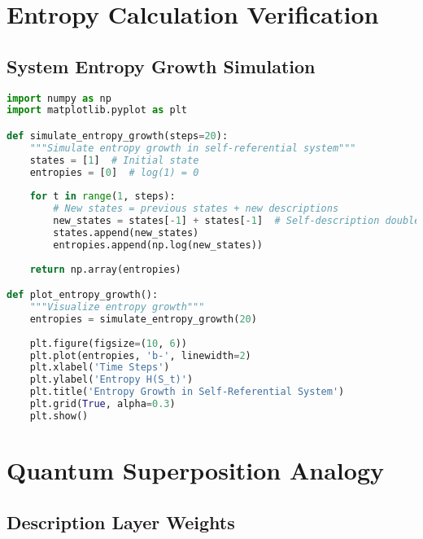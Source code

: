 \section{Entropy Calculation Verification}

\subsection{System Entropy Growth Simulation}

\begin{lstlisting}[language=Python, caption=Entropy Growth Verification]
import numpy as np
import matplotlib.pyplot as plt

def simulate_entropy_growth(steps=20):
    """Simulate entropy growth in self-referential system"""
    states = [1]  # Initial state
    entropies = [0]  # log(1) = 0
    
    for t in range(1, steps):
        # New states = previous states + new descriptions
        new_states = states[-1] + states[-1]  # Self-description doubles states
        states.append(new_states)
        entropies.append(np.log(new_states))
    
    return np.array(entropies)

def plot_entropy_growth():
    """Visualize entropy growth"""
    entropies = simulate_entropy_growth(20)
    
    plt.figure(figsize=(10, 6))
    plt.plot(entropies, 'b-', linewidth=2)
    plt.xlabel('Time Steps')
    plt.ylabel('Entropy H(S_t)')
    plt.title('Entropy Growth in Self-Referential System')
    plt.grid(True, alpha=0.3)
    plt.show()
\end{lstlisting}

\section{Quantum Superposition Analogy}

\subsection{Description Layer Weights}

